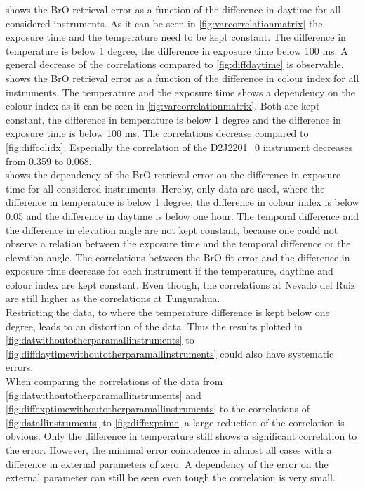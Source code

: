 \documentclass  [
  paper    = a4,
  BCOR     = 10mm,
  twoside,
  fontsize = 12pt,
  fleqn,
  toc      = bibnumbered,
  toc      = listofnumbered,
  numbers  = noendperiod,
  headings = normal,
  listof   = leveldown,
  version  = 3.03
]                                       {scrreprt}
\begin{document}
	 shows the BrO retrieval error as a function of the difference in daytime for all considered instruments. As it can be seen in \cref{fig:varcorrelationmatrix} the exposure time and the temperature need to be kept constant. The difference in temperature is below 1 degree, the difference in exposure time below 100 ms. A general decrease of the correlations compared to \cref{fig:diffdaytime} is observable.\\
	 shows the BrO retrieval error as a function of the difference in colour index for all instruments. The temperature and the exposure time shows a dependency on the colour index as it can be seen in \cref{fig:varcorrelationmatrix}. Both are kept constant, the difference in temperature is below 1 degree and the difference in exposure time is below 100 ms. The correlations decrease compared to \cref{fig:diffcolidx}. Especially the correlation of the D2J2201\_0 instrument decreases from 0.359 to 0.068.\\
	 shows the dependency of the BrO retrieval error on the difference in exposure time for all considered instruments. Hereby, only data are used, where the difference in temperature is below 1 degree, the difference in colour index is below 0.05 and the difference in daytime is below one hour. The temporal difference and the difference in elevation angle are not kept constant, because one could not observe a relation between the exposure time and the temporal difference or the elevation angle. The correlations between the BrO fit error and the difference in exposure time decrease for each instrument if the temperature, daytime and colour index are kept constant. Even though, the correlations at Nevado del Ruiz are still higher as the correlations at Tungurahua.\\
	Restricting the data, to where the temperature difference is kept below one degree, leads to an distortion of the data. Thus the results plotted in \cref{fig:datwithoutotherparamallinstruments} to \cref{fig:diffdaytimewithoutotherparamallinstruments} could also have systematic errors.\\
	When comparing the correlations of the data from \cref{fig:datwithoutotherparamallinstruments} and \cref{fig:diffexptimewithoutotherparamallinstruments}  to the correlations of 
	\cref{fig:datallinstruments} to \cref{fig:diffexptime} a large reduction of the correlation is obvious. Only the difference in temperature still shows a significant correlation to the   error. However, the minimal   error coincidence in almost all cases with a difference in external parameters of zero. A dependency of the   error on the external parameter can still be seen even tough the correlation is very small. \\
\end{document}
